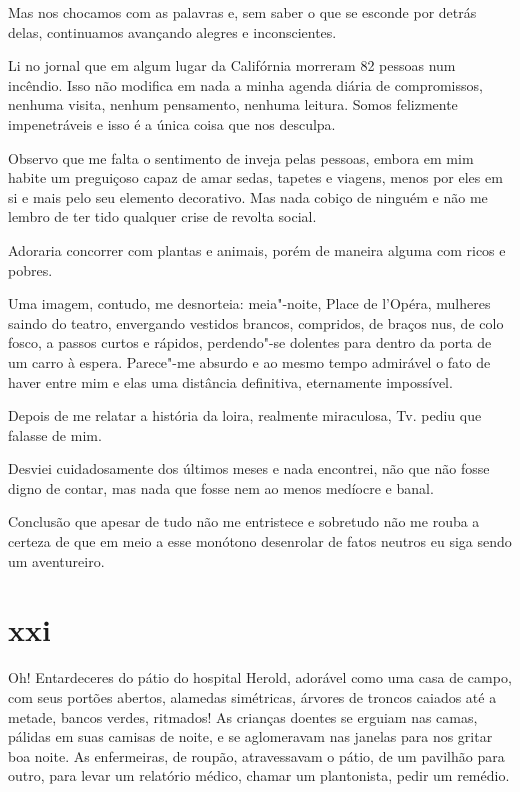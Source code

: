 Mas nos chocamos com as palavras e, sem saber o que se esconde por
detrás delas, continuamos avançando alegres e inconscientes.

Li no jornal que em algum lugar da Califórnia morreram 82 pessoas num
incêndio. Isso não modifica em nada a minha agenda diária de
compromissos, nenhuma visita, nenhum pensamento, nenhuma leitura. Somos
felizmente impenetráveis e isso é a única coisa que nos desculpa.

\asterisc

Observo que me falta o sentimento de inveja pelas pessoas, embora em mim
habite um preguiçoso capaz de amar sedas, tapetes e viagens, menos por
eles em si e mais pelo seu elemento decorativo. Mas nada cobiço de
ninguém e não me lembro de ter tido qualquer crise de revolta social.

Adoraria concorrer com plantas e animais, porém de maneira alguma com
ricos e pobres.

Uma imagem, contudo, me desnorteia: meia"-noite, Place de l'Opéra,
mulheres saindo do teatro, envergando vestidos brancos, compridos, de
braços nus, de colo fosco, a passos curtos e rápidos, perdendo"-se
dolentes para dentro da porta de um carro à espera. Parece"-me absurdo e
ao mesmo tempo admirável o fato de haver entre mim e elas uma
distância definitiva, eternamente impossível.

\asterisc

Depois de me relatar a história da loira, realmente miraculosa,
Tv. pediu que falasse de mim.

Desviei cuidadosamente dos últimos meses e nada encontrei, não que não
fosse digno de contar, mas nada que fosse nem ao menos medíocre e banal.

Conclusão que apesar de tudo não me entristece e sobretudo não me
rouba a certeza de que em meio a esse monótono desenrolar de fatos
neutros eu siga sendo um aventureiro.

\section{xxi}

Oh! Entardeceres do pátio do hospital Herold, adorável como uma casa de
campo, com seus portões abertos, alamedas simétricas, árvores de troncos
caiados até a metade, bancos verdes, ritmados! As crianças doentes se
erguiam nas camas, pálidas em suas camisas de noite, e se aglomeravam
nas janelas para nos gritar boa noite. As enfermeiras, de roupão,
atravessavam o pátio, de um pavilhão para outro, para levar um relatório
médico, chamar um plantonista, pedir um remédio.

